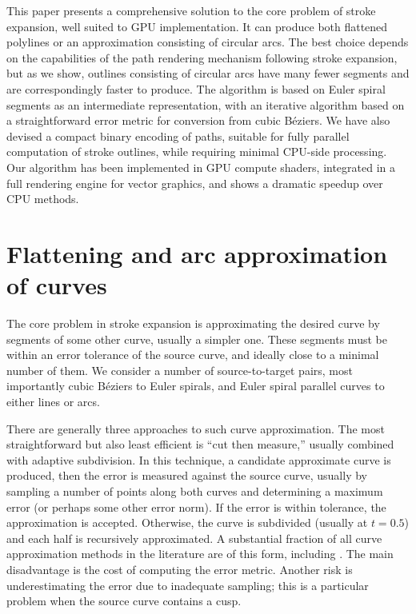 \documentclass[sigconf, nonacm]{acmart}
\begin{document}
This paper presents a comprehensive solution to the core problem of stroke expansion, well suited to GPU implementation. It can produce both flattened polylines or an approximation consisting of circular arcs. The best choice depends on the capabilities of the path rendering mechanism following stroke expansion, but as we show, outlines consisting of circular arcs have many fewer segments and are correspondingly faster to produce. The algorithm is based on Euler spiral segments as an intermediate representation, with an iterative algorithm based on a straightforward error metric for conversion from cubic Béziers. We have also devised a compact binary encoding of paths, suitable for fully parallel computation of stroke outlines, while requiring minimal CPU-side processing. Our algorithm has been implemented in GPU compute shaders, integrated in a full rendering engine for vector graphics, and shows a dramatic speedup over CPU methods.

\section{Flattening and arc approximation of curves}


The core problem in stroke expansion is approximating the desired curve by segments of some other curve, usually a simpler one. These segments must be within an error tolerance of the source curve, and ideally close to a minimal number of them. We consider a number of source-to-target pairs, most importantly cubic Béziers to Euler spirals, and Euler spiral parallel curves to either lines or arcs.

There are generally three approaches to such curve approximation. The most straightforward but also least efficient is ``cut then measure,'' usually combined with adaptive subdivision. In this technique, a candidate approximate curve is produced, then the error is measured against the source curve, usually by sampling a number of points along both curves and determining a maximum error (or perhaps some other error norm). If the error is within tolerance, the approximation is accepted. Otherwise, the curve is subdivided (usually at $t = 0.5$) and each half is recursively approximated. A substantial fraction of all curve approximation methods in the literature are of this form, including \citet{Nehab2020}. The main disadvantage is the cost of computing the error metric. Another risk is underestimating the error due to inadequate sampling; this is a particular problem when the source curve contains a cusp.
\end{document}
